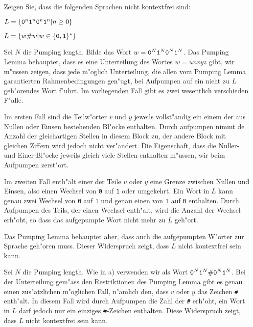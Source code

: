 Zeigen Sie, dass die folgenden Sprachen nicht kontextfrei sind:
\begin{teilaufgaben}
\item $L=\{{\tt 0}^n{\tt 1}^n{\tt 0}^n{\tt 1}^n|n\ge 0\}$
\item $L=\{w{\tt \#}w|w\in\{{\tt 0},{\tt 1}\}^*\}$
\end{teilaufgaben}

\begin{loesung}
\begin{teilaufgaben}
\item Sei $N$ die Pumping length.
Bilde das Wort $w={\tt 0}^N{\tt 1}^N{\tt 0}^N{\tt 1}^N$. Das Pumping Lemma
behauptet, dass es eine Unterteilung des Wortes $w=uvxyz$ gibt, wir
m"ussen zeigen, dass jede m"oglich Unterteilung, die allen vom
Pumping Lemma garantierten Rahmenbedingungen gen"ugt, bei Aufpumpen
auf ein nicht zu $L$ geh"orendes Wort f"uhrt. Im vorliegenden Fall
gibt es zwei wesentlich verschieden F"alle.

Im ersten Fall sind die
Teilw"orter $v$ und $y$ jeweils vollst"andig ein einem der aus Nullen
oder Einsen bestehenden Bl"ocke enthalten. Durch aufpumpen nimmt de
Anzahl der gleichartigen Stellen in diesem Block zu, der andere Block
mit gleichen Ziffern wird jedoch nicht ver"andert. Die Eigenschaft,
dass die Nuller- und
Einer-Bl"ocke jeweils gleich viele Stellen enthalten m"ussen, wir
beim Aufpumpen zerst"ort.

Im zweiten Fall enth"alt einer der Teile $v$ oder $y$ eine
Grenze zwischen Nullen und Einsen, also einen Wechsel von
{\tt 0} auf {\tt 1} oder umgekehrt. Ein Wort in $L$ kann
genau zwei Wechsel von {\tt 0} auf {\tt 1} und genau einen
von {\tt 1} auf {\tt 0} enthalten. Durch Aufpumpen des Teils,
der einen Wechsel enth"alt, wird die Anzahl der Wechsel erh"oht,
so dass das aufgepumpte Wort nicht mehr zu $L$ geh"ort.

Das Pumping Lemma behauptet aber, dass auch die aufgepumpten W"orter
zur Sprache geh"oren muss. Dieser Widerspruch zeigt, dass $L$
nicht kontextfrei sein kann.
\item Sei $N$ die Pumping length. Wie in a) verwenden wir als
Wort ${\tt 0}^N{\tt 1}^N{\tt\#}{\tt 0}^N{\tt 1}^N$. Bei der Unterteilung
gem"ass den Restriktionen des Pumping Lemma gibt es genau einen zus"atzlichen
m"oglichen Fall, n"amlich den, dass $v$ oder $y$ das Zeichen {\tt\#}
enth"alt. In diesem Fall wird durch Aufpumpen die Zahl der {\tt\#}
erh"oht, ein Wort in $L$ darf jedoch nur ein einziges {\tt\#}-Zeichen
enthalten. Diese Widerspruch zeigt, dass $L$ nicht kontextfrei sein kann.
\qedhere
\end{teilaufgaben}
\end{loesung}
